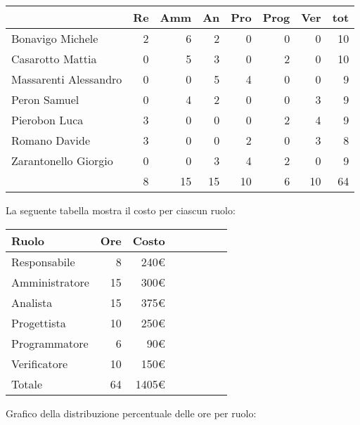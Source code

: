 \begin{table}[H]
    \begin{tabularx}{\linewidth}{X|rrrrrrr}
    \rowcolor{gray!30}& Re & Amm & An & Pro & Prog & Ver & tot \\
    \hline
    Bonavigo Michele                        & 2 & 6 & 2 & 0 & 0 & 0 & 10 \\
    \rowcolor{gray!10}Casarotto Mattia      & 0 & 5 & 3 & 0 & 2 & 0 & 10 \\
    Massarenti Alessandro                   & 0 & 0 & 5 & 4 & 0 & 0 & 9  \\
    \rowcolor{gray!10}Peron Samuel          & 0 & 4 & 2 & 0 & 0 & 3 & 9 \\
    Pierobon Luca                           & 3 & 0 & 0 & 0 & 2 & 4 & 9  \\
    \rowcolor{gray!10}Romano Davide         & 3 & 0 & 0 & 2 & 0 & 3 & 8 \\
    Zarantonello Giorgio                    & 0 & 0 & 3 & 4 & 2 & 0 & 9 \\
    \hline                                  & 8 & 15 & 15 & 10 & 6 & 10 & 64 \\ 
    \end{tabularx}
\end{table}

La seguente tabella mostra il costo per ciascun ruolo:
\begin{table}[H]
    \begin{tabularx}{\linewidth}{X|rrrrrrr}
    \rowcolor{gray!30}Ruolo & Ore & Costo \\
    \hline
    Responsabile                            & 8 & 240€ \\
    \rowcolor{gray!10}Amministratore        & 15 & 300€ \\
    Analista                                & 15 & 375€ \\
    \rowcolor{gray!10}Progettista           & 10 & 250€ \\
    Programmatore                           & 6 & 90€ \\
    \rowcolor{gray!10}Verificatore          & 10 & 150€ \\
    \hline Totale                           & 64 & 1405€ \\ 
    \end{tabularx}
\end{table}

Grafico della distribuzione percentuale delle ore per ruolo:
\begin{center}
\end{center}

